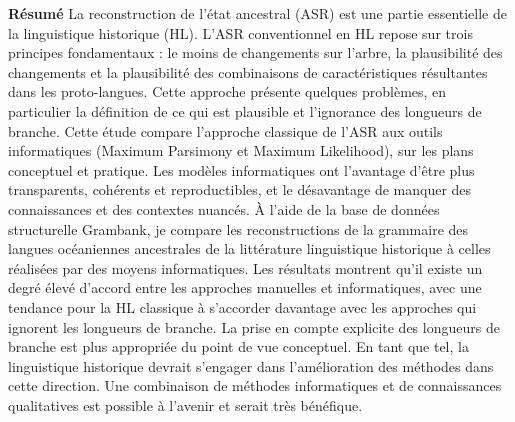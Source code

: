 \documentclass[12pt,letterpaper]{article}
\begin{document}
\textbf{Résumé}
La reconstruction de l'état ancestral (ASR) est une partie essentielle de la linguistique historique (HL). L'ASR conventionnel en HL repose sur trois principes fondamentaux : le moins de changements sur l'arbre, la plausibilité des changements et la plausibilité des combinaisons de caractéristiques résultantes dans les proto-langues. Cette approche présente quelques problèmes, en particulier la définition de ce qui est plausible et l'ignorance des longueurs de branche. Cette étude compare l'approche classique de l'ASR aux outils informatiques (Maximum Parsimony et Maximum Likelihood), sur les plans conceptuel et pratique. Les modèles informatiques ont l'avantage d'être plus transparents, cohérents et reproductibles, et le désavantage de manquer des connaissances et des contextes nuancés. À l'aide de la base de données structurelle Grambank, je compare les reconstructions de la grammaire des langues océaniennes ancestrales de la littérature linguistique historique à celles réalisées par des moyens informatiques. Les résultats montrent qu'il existe un degré élevé d'accord entre les approches manuelles et informatiques, avec une tendance pour la HL classique à s'accorder davantage avec les approches qui ignorent les longueurs de branche. La prise en compte explicite des longueurs de branche est plus appropriée du point de vue conceptuel. En tant que tel, la linguistique historique devrait s'engager dans l'amélioration des méthodes dans cette direction. Une combinaison de méthodes informatiques et de connaissances qualitatives est possible à l'avenir et serait très bénéfique.
\end{document}
